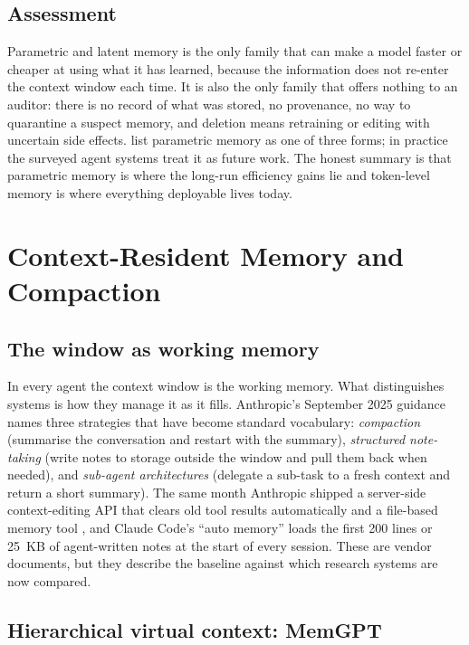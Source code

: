 \documentclass[11pt]{article}
\begin{document}
\subsection{Assessment}

Parametric and latent memory is the only family that can make a model faster or cheaper at using what it has learned, because the information does not re-enter the context window each time. It is also the only family that offers nothing to an auditor: there is no record of what was stored, no provenance, no way to quarantine a suspect memory, and deletion means retraining or editing with uncertain side effects. \citet{hu2025memoryage} list parametric memory as one of three forms; in practice the surveyed agent systems treat it as future work. The honest summary is that parametric memory is where the long-run efficiency gains lie and token-level memory is where everything deployable lives today.

\section{Context-Resident Memory and Compaction}
\label{sec:context}

\subsection{The window as working memory}

In every agent the context window is the working memory. What distinguishes systems is how they manage it as it fills. Anthropic's September 2025 guidance \citep{anthropic2025context} names three strategies that have become standard vocabulary: \emph{compaction} (summarise the conversation and restart with the summary), \emph{structured note-taking} (write notes to storage outside the window and pull them back when needed), and \emph{sub-agent architectures} (delegate a sub-task to a fresh context and return a short summary). The same month Anthropic shipped a server-side context-editing API that clears old tool results automatically and a file-based memory tool \citep{anthropic2025memorytool}, and Claude Code's ``auto memory'' \citep{anthropic2026claudecode} loads the first 200 lines or 25~KB of agent-written notes at the start of every session. These are vendor documents, but they describe the baseline against which research systems are now compared.

\subsection{Hierarchical virtual context: MemGPT}
\end{document}
